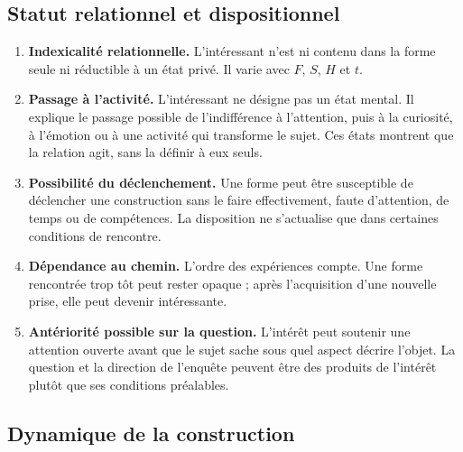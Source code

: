 \documentclass[11pt,a4paper]{article}
\begin{document}
\subsection{Statut relationnel et dispositionnel}

\begin{enumerate}
  \item \textbf{Indexicalité relationnelle.} L'intéressant n'est ni contenu
        dans la forme seule ni réductible à un état privé. Il varie avec
        \(F\), \(S\), \(H\) et \(t\).
  \item \textbf{Passage à l'activité.} L'intéressant ne désigne pas un état
        mental. Il explique le passage possible de l'indifférence à l'attention,
        puis à la curiosité, à l'émotion ou à une activité qui transforme le
        sujet. Ces états montrent que la relation agit, sans la définir à eux seuls.
  \item \textbf{Possibilité du déclenchement.} Une forme peut être susceptible de
        déclencher une construction sans le faire effectivement, faute
        d'attention, de temps ou de compétences. La disposition ne s'actualise
        que dans certaines conditions de rencontre.
  \item \textbf{Dépendance au chemin.} L'ordre des expériences compte. Une
        forme rencontrée trop tôt peut rester opaque ; après l'acquisition
        d'une nouvelle prise, elle peut devenir intéressante.
  \item \textbf{Antériorité possible sur la question.} L'intérêt peut soutenir
        une attention ouverte avant que le sujet sache sous quel aspect décrire
        l'objet. La question et la direction de l'enquête peuvent être des
        produits de l'intérêt plutôt que ses conditions préalables.
\end{enumerate}

\subsection{Dynamique de la construction}
\end{document}
